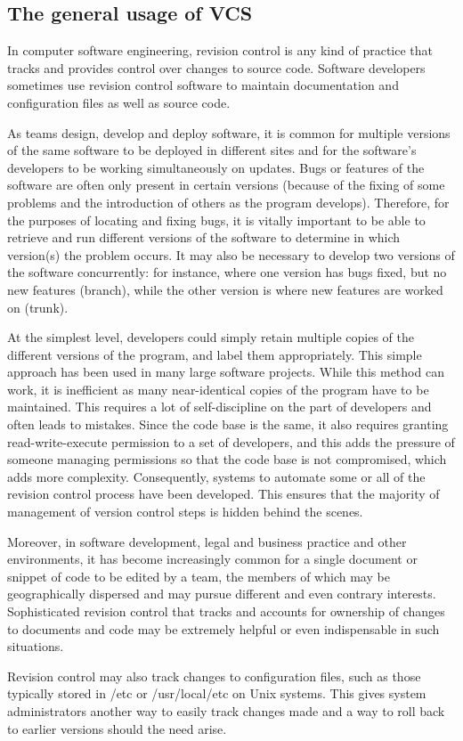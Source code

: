 \documentclass[a4paper]{report}
\begin{document}
\subsection{The general usage of VCS}
\par
In computer software engineering, revision control is any kind of practice that tracks and provides control over changes to source code. Software developers sometimes use revision control software to maintain documentation and configuration files as well as source code.
\par
As teams design, develop and deploy software, it is common for multiple versions of the same software to be deployed in different sites and for the software's developers to be working simultaneously on updates. Bugs or features of the software are often only present in certain versions (because of the fixing of some problems and the introduction of others as the program develops). Therefore, for the purposes of locating and fixing bugs, it is vitally important to be able to retrieve and run different versions of the software to determine in which version(s) the problem occurs. It may also be necessary to develop two versions of the software concurrently: for instance, where one version has bugs fixed, but no new features (branch), while the other version is where new features are worked on (trunk).
\par
At the simplest level, developers could simply retain multiple copies of the different versions of the program, and label them appropriately. This simple approach has been used in many large software projects. While this method can work, it is inefficient as many near-identical copies of the program have to be maintained. This requires a lot of self-discipline on the part of developers and often leads to mistakes. Since the code base is the same, it also requires granting read-write-execute permission to a set of developers, and this adds the pressure of someone managing permissions so that the code base is not compromised, which adds more complexity. Consequently, systems to automate some or all of the revision control process have been developed. This ensures that the majority of management of version control steps is hidden behind the scenes.
\par
Moreover, in software development, legal and business practice and other environments, it has become increasingly common for a single document or snippet of code to be edited by a team, the members of which may be geographically dispersed and may pursue different and even contrary interests. Sophisticated revision control that tracks and accounts for ownership of changes to documents and code may be extremely helpful or even indispensable in such situations.
\par
Revision control may also track changes to configuration files, such as those typically stored in /etc or /usr/local/etc on Unix systems. This gives system administrators another way to easily track changes made and a way to roll back to earlier versions should the need arise.
\end{document}
